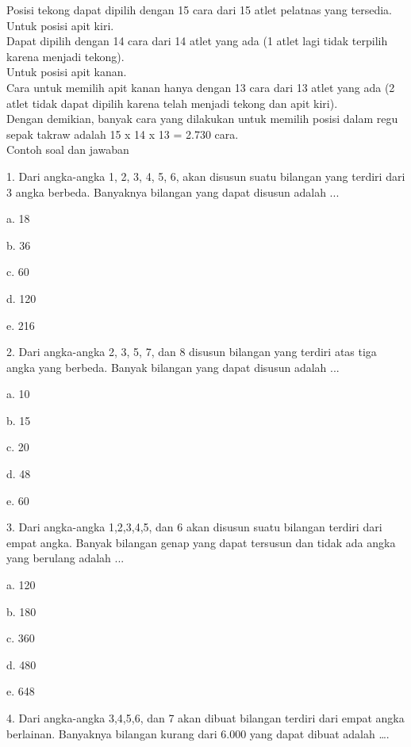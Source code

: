 \documentclass[11pt,fleqn]{book} %
\begin{document}
Posisi tekong dapat dipilih dengan 15 cara dari 15 atlet pelatnas yang tersedia.\\

Untuk posisi apit kiri.\\

Dapat dipilih dengan 14 cara dari 14 atlet yang ada (1 atlet lagi tidak terpilih karena menjadi tekong).\\

Untuk posisi apit kanan.\\

Cara untuk memilih apit kanan hanya dengan 13 cara dari 13 atlet yang ada (2 atlet tidak dapat dipilih karena telah menjadi tekong dan apit kiri).\\

Dengan demikian, banyak cara yang dilakukan untuk memilih posisi dalam regu sepak takraw adalah 15 x 14 x 13 = 2.730 cara.\\

 
Contoh soal dan jawaban

1. Dari angka-angka 1, 2, 3, 4, 5, 6, akan disusun suatu bilangan yang terdiri dari 3 angka berbeda. Banyaknya bilangan yang dapat disusun adalah ... 

a.	18

b.	36

c.	60

d.	120

e.	216



2. Dari angka-angka 2, 3, 5, 7, dan 8 disusun bilangan yang terdiri atas tiga angka yang berbeda. Banyak bilangan yang dapat disusun adalah ... 

a.	10

b.	15

c.	20

d.	48

e.	60


3. Dari angka-angka 1,2,3,4,5, dan 6 akan disusun suatu bilangan terdiri dari empat angka. Banyak bilangan genap yang dapat tersusun dan tidak ada angka yang berulang adalah ... 

a.	120

b.	180

c.	360

d.	480

e.	648 


4. Dari angka-angka 3,4,5,6, dan 7 akan dibuat bilangan terdiri dari empat angka berlainan. Banyaknya bilangan kurang dari 6.000 yang dapat dibuat adalah …. 
\end{document}
